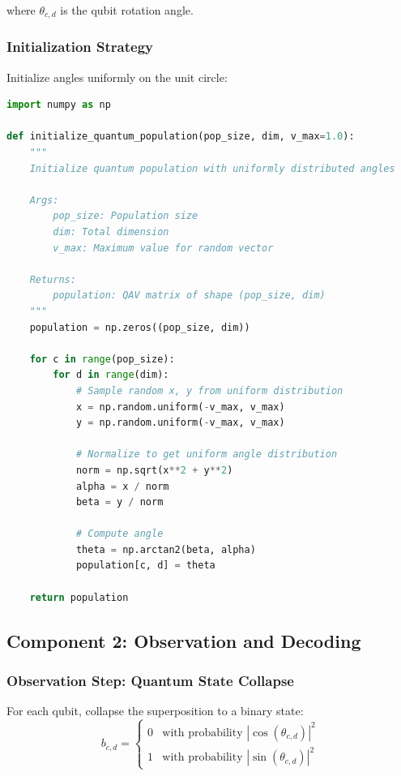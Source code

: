 \documentclass[12pt,a4paper]{article}
\begin{document}
where $\theta_{c,d}$ is the qubit rotation angle.

\subsubsection{Initialization Strategy}

Initialize angles uniformly on the unit circle:
\begin{lstlisting}[language=Python, caption=Quantum Population Initialization]
import numpy as np

def initialize_quantum_population(pop_size, dim, v_max=1.0):
    """
    Initialize quantum population with uniformly distributed angles
    
    Args:
        pop_size: Population size
        dim: Total dimension
        v_max: Maximum value for random vector
    
    Returns:
        population: QAV matrix of shape (pop_size, dim)
    """
    population = np.zeros((pop_size, dim))
    
    for c in range(pop_size):
        for d in range(dim):
            # Sample random x, y from uniform distribution
            x = np.random.uniform(-v_max, v_max)
            y = np.random.uniform(-v_max, v_max)
            
            # Normalize to get uniform angle distribution
            norm = np.sqrt(x**2 + y**2)
            alpha = x / norm
            beta = y / norm
            
            # Compute angle
            theta = np.arctan2(beta, alpha)
            population[c, d] = theta
    
    return population
\end{lstlisting}

\subsection{Component 2: Observation and Decoding}

\subsubsection{Observation Step: Quantum State Collapse}

For each qubit, collapse the superposition to a binary state:
\begin{equation}
b_{c,d} = \begin{cases}
0 & \text{with probability } |\cos(\theta_{c,d})|^2 \\
1 & \text{with probability } |\sin(\theta_{c,d})|^2
\end{cases}
\end{equation}
\end{document}
